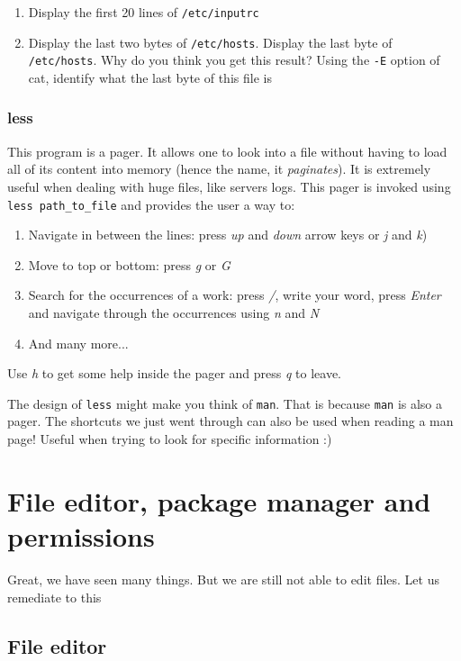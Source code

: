 \documentclass[12pt]{article}
\begin{document}
\begin{enumerate}
\item Display the first 20 lines of \texttt{/etc/inputrc}
\item Display the last two bytes of \texttt{/etc/hosts}. Display the last byte of \texttt{/etc/hosts}. Why do you think you get this result? Using the \texttt{-E} option of cat, identify what the last byte of this file is
\end{enumerate}

\subsubsection{less}

This program is a pager. It allows one to look into a file without having to load all of its content into memory (hence the name, it \textit{paginates}). It is extremely useful when dealing with huge files, like servers logs.
This pager is invoked using \texttt{less path\_to\_file} and provides the user a way to:
\begin{enumerate}
\item Navigate in between the lines: press \textit{up} and \textit{down} arrow keys or \textit{j} and \textit{k})
\item Move to top or bottom: press \textit{g} or \textit{G}
\item Search for the occurrences of a work: press \textit{/}, write your word, press \textit{Enter} and navigate through the occurrences using \textit{n} and \textit{N}
\item And many more...
\end{enumerate} 

Use \textit{h} to get some help inside the pager and press {\textit{q}} to leave.

The design of \texttt{less} might make you think of \texttt{man}. That is because \texttt{man} is also a pager. The shortcuts we just went through can also be used when reading a man page! Useful when trying to look for specific information :)


\section{File editor, package manager and permissions}

Great, we have seen many things. But we are still not able to edit files. Let us remediate to this

\subsection{File editor}
\end{document}

